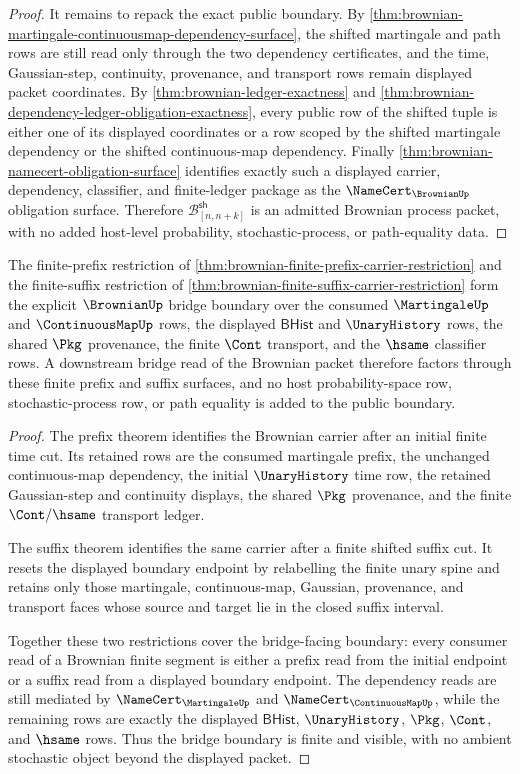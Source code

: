 \begin{proof}
It remains to repack the exact public boundary. By
\autoref{thm:brownian-martingale-continuousmap-dependency-surface}, the shifted
martingale and path rows are still read only through the two dependency
certificates, and the time, Gaussian-step, continuity, provenance, and
transport rows remain displayed packet coordinates. By
\autoref{thm:brownian-ledger-exactness} and
\autoref{thm:brownian-dependency-ledger-obligation-exactness}, every public row
of the shifted tuple is either one of its displayed coordinates or a row scoped
by the shifted martingale dependency or the shifted continuous-map dependency.
Finally \autoref{thm:brownian-namecert-obligation-surface} identifies exactly
such a displayed carrier, dependency, classifier, and finite-ledger package as
the $\NameCert_{\BrownianUp}$ obligation surface. Therefore
$\mathcal{B}_{[n,n+k]}^{\mathsf{sh}}$ is an admitted Brownian process packet,
with no added host-level probability, stochastic-process, or path-equality
data.
\end{proof}

\begin{theorem}
\label{thm:brownian-finite-prefix-suffix-bridge-boundary}
The finite-prefix restriction of
\autoref{thm:brownian-finite-prefix-carrier-restriction} and the finite-suffix
restriction of \autoref{thm:brownian-finite-suffix-carrier-restriction} form
the explicit $\BrownianUp$ bridge boundary over the consumed
$\MartingaleUp$ and $\ContinuousMapUp$ rows, the displayed $\mathsf{BHist}$
and $\UnaryHistory$ rows, the shared $\Pkg$ provenance, the finite $\Cont$
transport, and the $\hsame$ classifier rows. A downstream bridge read of the
Brownian packet therefore factors through these finite prefix and suffix
surfaces, and no host probability-space row, stochastic-process row, or path
equality is added to the public boundary.
\end{theorem}
\begin{proof}
The prefix theorem identifies the Brownian carrier after an initial finite
time cut. Its retained rows are the consumed martingale prefix, the unchanged
continuous-map dependency, the initial $\UnaryHistory$ time row, the retained
Gaussian-step and continuity displays, the shared $\Pkg$ provenance, and the
finite $\Cont/\hsame$ transport ledger.

The suffix theorem identifies the same carrier after a finite shifted suffix
cut. It resets the displayed boundary endpoint by relabelling the finite
unary spine and retains only those martingale, continuous-map, Gaussian,
provenance, and transport faces whose source and target lie in the closed
suffix interval.

Together these two restrictions cover the bridge-facing boundary: every
consumer read of a Brownian finite segment is either a prefix read from the
initial endpoint or a suffix read from a displayed boundary endpoint. The
dependency reads are still mediated by $\NameCert_{\MartingaleUp}$ and
$\NameCert_{\ContinuousMapUp}$, while the remaining rows are exactly the
displayed $\mathsf{BHist}$, $\UnaryHistory$, $\Pkg$, $\Cont$, and $\hsame$
rows. Thus the bridge boundary is finite and visible, with no ambient
stochastic object beyond the displayed packet.
\end{proof}
